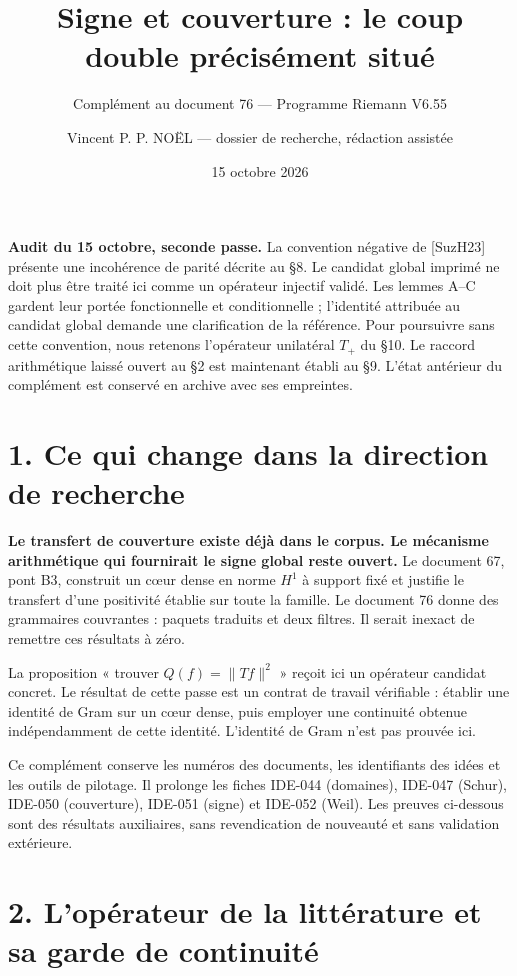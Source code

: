 \documentclass[
  11pt,
]{article}
\title{Signe et couverture : le coup double précisément situé}
\subtitle{Complément au document 76 --- Programme Riemann V6.55}
\author{Vincent P. P. NOËL --- dossier de recherche, rédaction assistée}
\date{15 octobre 2026}
\begin{document}
\maketitle

\textbf{Audit du 15 octobre, seconde passe.} La convention négative de
{[}SuzH23{]} présente une incohérence de parité décrite au §8. Le
candidat global imprimé ne doit plus être traité ici comme un opérateur
injectif validé. Les lemmes A--C gardent leur portée fonctionnelle et
conditionnelle ; l'identité attribuée au candidat global demande une
clarification de la référence. Pour poursuivre sans cette convention,
nous retenons l'opérateur unilatéral \(T_+\) du §10. Le raccord
arithmétique laissé ouvert au §2 est maintenant établi au §9. L'état
antérieur du complément est conservé en archive avec ses empreintes.

\hypertarget{ce-qui-change-dans-la-direction-de-recherche}{%
\section{1. Ce qui change dans la direction de
recherche}\label{ce-qui-change-dans-la-direction-de-recherche}}

\textbf{Le transfert de couverture existe déjà dans le corpus. Le
mécanisme arithmétique qui fournirait le signe global reste ouvert.} Le
document 67, pont B3, construit un cœur dense en norme \(H^1\) à support
fixé et justifie le transfert d'une positivité établie sur toute la
famille. Le document 76 donne des grammaires couvrantes : paquets
traduits et deux filtres. Il serait inexact de remettre ces résultats à
zéro.

La proposition « trouver \(Q(f)=\|Tf\|^2\) » reçoit ici un opérateur
candidat concret. Le résultat de cette passe est un contrat de travail
vérifiable : établir une identité de Gram sur un cœur dense, puis
employer une continuité obtenue indépendamment de cette identité.
L'identité de Gram n'est pas prouvée ici.

Ce complément conserve les numéros des documents, les identifiants des
idées et les outils de pilotage. Il prolonge les fiches IDE-044
(domaines), IDE-047 (Schur), IDE-050 (couverture), IDE-051 (signe) et
IDE-052 (Weil). Les preuves ci-dessous sont des résultats auxiliaires,
sans revendication de nouveauté et sans validation extérieure.

\hypertarget{lopuxe9rateur-de-la-littuxe9rature-et-sa-garde-de-continuituxe9}{%
\section{2. L'opérateur de la littérature et sa garde de
continuité}\label{lopuxe9rateur-de-la-littuxe9rature-et-sa-garde-de-continuituxe9}}
\end{document}
